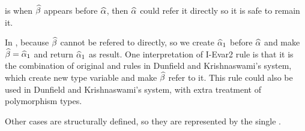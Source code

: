  is when $\widehat{\beta}$ appears before $\widehat{\alpha}$, then $\widehat{\alpha}$ could refer it directly so it is safe to remain it.

In , because $\widehat{\beta}$ cannot be refered to directly, so we create $\widehat{\alpha}_1$ before $\widehat{\alpha}$ and make $\widehat{\beta}=\widehat{\alpha}_1$ and return $\widehat{\alpha}_1$ as result. One interpretation of I-Evar2 rule is that it is the combination of original  and  rules in Dunfield and Krishnaswami's system, which create new type variable and make $\widehat{\beta}$ refer to it. This rule could also be used in Dunfield and Krishnaswami's system, with extra treatment of polymorphism types.

Other cases are structurally defined, so they are represented by the single .
